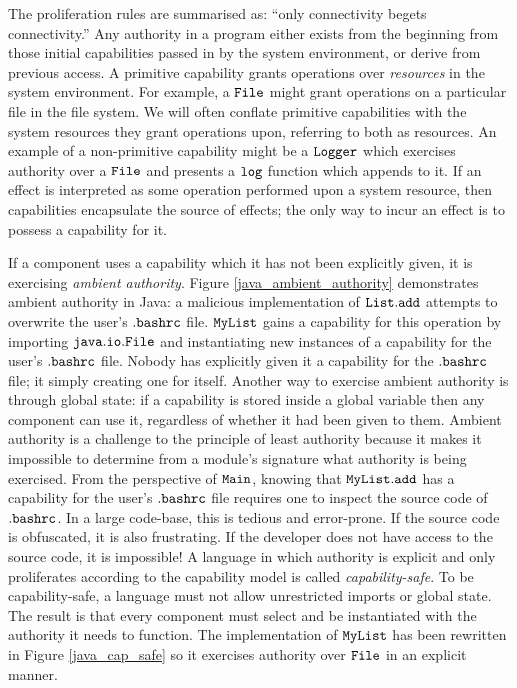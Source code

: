 The proliferation rules are summarised as: ``only connectivity begets connectivity.'' Any authority in a program either exists from the beginning from those initial capabilities passed in by the system environment, or derive from previous access. A primitive capability grants operations over \textit{resources} in the system environment. For example, a $\mathtt{File}$ might grant operations on a particular file in the file system. We will often conflate primitive capabilities with the system resources they grant operations upon, referring to both as resources. An example of a non-primitive capability might be a $\mathtt{Logger}$ which exercises authority over a $\mathtt{File}$ and presents a $\mathtt{log}$ function which appends to it. If an effect is interpreted as some operation performed upon a system resource, then capabilities encapsulate the source of effects; the only way to incur an effect is to possess a capability for it.

If a component uses a capability which it has not been explicitly given, it is exercising \textit{ambient authority}. Figure \ref{java_ambient_authority} demonstrates ambient authority in Java: a malicious implementation of $\mathtt{List.add}$ attempts to overwrite the user's $\mathtt{.bashrc}$ file. $\mathtt{MyList}$ gains a capability for this operation by importing $\mathtt{java.io.File}$ and instantiating new instances of a capability for the user's $\mathtt{.bashrc}$ file. Nobody has explicitly given it a capability for the $\mathtt{.bashrc}$ file; it simply creating one for itself. Another way to exercise ambient authority is through global state: if a capability is stored inside a global variable then any component can use it, regardless of whether it had been given to them. Ambient authority is a challenge to the principle of least authority because it makes it impossible to determine from a module's signature what authority is being exercised. From the perspective of $\mathtt{Main}$, knowing that $\mathtt{MyList.add}$ has a capability for the user's $\mathtt{.bashrc}$ file requires one to inspect the source code of $\mathtt{.bashrc}$. In a large code-base, this is tedious and error-prone. If the source code is obfuscated, it is also frustrating. If the developer does not have access to the source code, it is impossible! A language in which authority is explicit and only proliferates according to the capability model is called \textit{capability-safe}. To be capability-safe, a language must not allow unrestricted imports or global state. The result is that every component must select and be instantiated with the authority it needs to function. The implementation of $\mathtt{MyList}$ has been rewritten in Figure \ref{java_cap_safe} so it exercises authority over $\mathtt{File}$ in an explicit manner.

